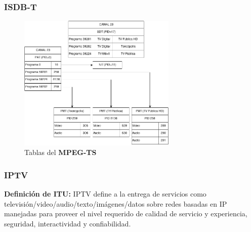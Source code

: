 \documentclass[a4paper,11pt]{beamer}
\begin{document}

\begin{frame}
\frametitle{ISDB-T}
\begin{center}
\begin{figure}
 \includegraphics[height=6.5cm]{canal_23_tables.png} \caption{Tablas del \textbf{MPEG-TS}}
\end{figure}
\end{center}
\end{frame}


\begin{frame}
\frametitle{IPTV}
\begin{center}
\textbf{Definición de ITU:} IPTV define a la entrega de servicios como televisión/video/audio/texto/imágenes/datos sobre redes basadas en IP manejadas para proveer el nivel requerido de calidad de servicio y experiencia, seguridad, interactividad y confiabilidad.


\end{center}
\end{frame}
\end{document}
